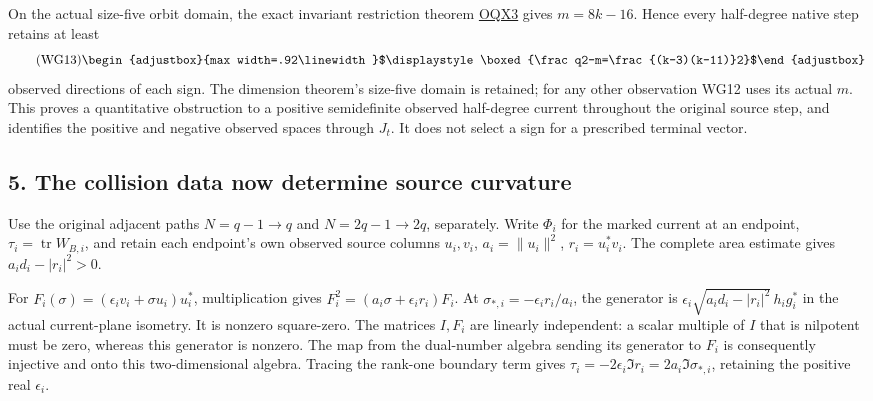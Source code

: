 \documentclass[11pt]{article}
\begin{document}
On the actual size-five orbit domain, the exact invariant restriction theorem \href{https://github.com/KokunoYumeto/zeta-function-research-reader/blob/4ba9285b66af58a6d58fc502a494c1fb45ca5b79/workbenches/splitzero-tandem/continuations/20260922-support-transport/RETAINED_COMPLETE_PROOF_SOURCES.tex\#L11702}{OQX3} gives \(m=8k-16\). Hence every half-degree native step retains at least 
\begin{equation*}
\tag{WG13}
\begin{adjustbox}{max width=.92\linewidth}$\displaystyle \boxed{\frac q2-m=\frac{(k-3)(k-11)}2}$\end{adjustbox}
\end{equation*}
 observed directions of each sign. The dimension theorem's size-five domain is retained; for any other observation WG12 uses its actual \(m\). This proves a quantitative obstruction to a positive semidefinite observed half-degree current throughout the original source step, and identifies the positive and negative observed spaces through \(J_t\). It does not select a sign for a prescribed terminal vector.

\subsection{5. The collision data now determine source curvature}\label{part1-the-collision-data-now-determine-source-curvature}

Use the original adjacent paths \(N=q-1\to q\) and \(N=2q-1\to2q\), separately. Write \(\Phi_i\) for the marked current at an endpoint, \(\tau_i=\operatorname{tr}W_{B,i}\), and retain each endpoint's own observed source columns \(u_i,v_i\), \(a_i=\|u_i\|^2\), \(r_i=u_i^*v_i\). The complete area estimate gives \(a_id_i-|r_i|^2>0\).

For \(F_i(\sigma)=(\epsilon_i v_i+\sigma u_i)u_i^*\), multiplication gives \(F_i^2=(a_i\sigma+\epsilon_i r_i)F_i\). At \(\sigma_{*,i}=-\epsilon_i r_i/a_i\), the generator is \(\epsilon_i\sqrt{a_id_i-|r_i|^2}\,h_i g_i^*\) in the actual current-plane isometry. It is nonzero square-zero. The matrices \(I,F_i\) are linearly independent: a scalar multiple of \(I\) that is nilpotent must be zero, whereas this generator is nonzero. The map from the dual-number algebra sending its generator to \(F_i\) is consequently injective and onto this two-dimensional algebra. Tracing the rank-one boundary term gives \(\tau_i=-2\epsilon_i\Im r_i=2a_i\Im\sigma_{*,i}\), retaining the positive real \(\epsilon_i\).
\end{document}
